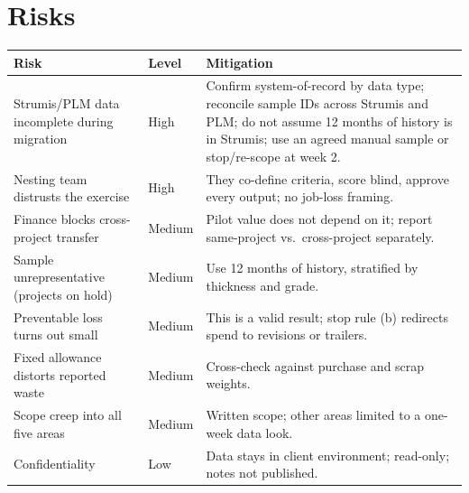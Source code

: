\documentclass[10pt,a4paper]{article}
\begin{document}
\section{Risks}
\small
\begin{tabular}{@{}P{4.4cm}P{2.0cm}P{9.5cm}@{}}
\toprule
\textbf{Risk} & \textbf{Level} & \textbf{Mitigation} \\
\midrule
Strumis/PLM data incomplete during migration & High & Confirm system-of-record by data type; reconcile sample IDs across Strumis and PLM; do not assume 12 months of history is in Strumis; use an agreed manual sample or stop/re-scope at week 2. \\
Nesting team distrusts the exercise & High & They co-define criteria, score blind, approve every output; no job-loss framing. \\
Finance blocks cross-project transfer & Medium & Pilot value does not depend on it; report same-project vs.\ cross-project separately. \\
Sample unrepresentative (projects on hold) & Medium & Use 12 months of history, stratified by thickness and grade. \\
Preventable loss turns out small & Medium & This is a valid result; stop rule (b) redirects spend to revisions or trailers. \\
Fixed allowance distorts reported waste & Medium & Cross-check against purchase and scrap weights. \\
Scope creep into all five areas & Medium & Written scope; other areas limited to a one-week data look. \\
Confidentiality & Low & Data stays in client environment; read-only; notes not published. \\
\bottomrule
\end{tabular}
\normalsize

\newpage
\appendix
\end{document}
